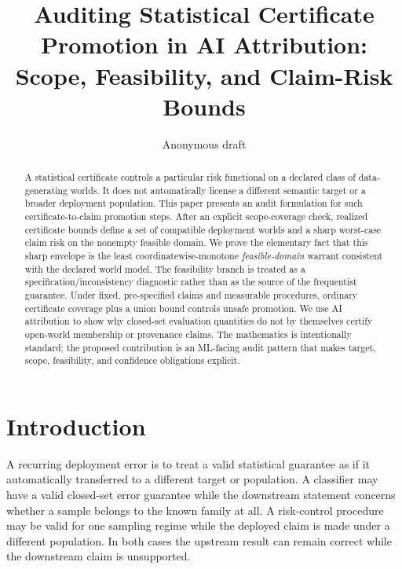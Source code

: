 \documentclass[10pt]{article}
\title{Auditing Statistical Certificate Promotion in AI Attribution:\\
Scope, Feasibility, and Claim-Risk Bounds}
\author{Anonymous draft}
\date{}
\begin{document}
\maketitle
\begingroup
\renewcommand{\thefootnote}{}
\addtocounter{footnote}{-1}
\endgroup

\begin{abstract}
A statistical certificate controls a particular risk functional on a declared
class of data-generating worlds. It does not automatically license a different
semantic target or a broader deployment population. This paper presents an
audit formulation for such certificate-to-claim promotion steps. After an
explicit scope-coverage check, realized certificate bounds define a set of
compatible deployment worlds and a sharp worst-case claim risk on the nonempty
feasible domain. We prove the elementary fact that this sharp envelope is the
least coordinatewise-monotone \emph{feasible-domain} warrant consistent with
the declared world model. The feasibility branch is treated as a
specification/inconsistency diagnostic rather than as the source of the
frequentist guarantee. Under fixed, pre-specified claims and measurable
procedures, ordinary certificate coverage plus a union bound controls unsafe
promotion. We use AI attribution to show why closed-set evaluation quantities
do not by themselves certify open-world membership or provenance claims. The
mathematics is intentionally standard; the proposed contribution is an
ML-facing audit pattern that makes target, scope, feasibility, and confidence
obligations explicit.
\end{abstract}

\section{Introduction}

A recurring deployment error is to treat a valid statistical guarantee as if it
automatically transferred to a different target or population.  A classifier
may have a valid closed-set error guarantee while the downstream statement
concerns whether a sample belongs to the known family at all.  A risk-control
procedure may be valid for one sampling regime while the deployed claim is made
under a different population.  In both cases the upstream result can remain
correct while the downstream claim is unsupported.
\end{document}
